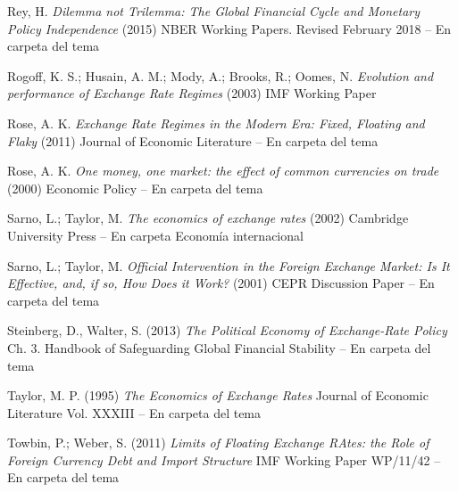 \documentclass{nuevotema}
\begin{document}
Rey, H. \textit{Dilemma not Trilemma: The Global Financial Cycle and Monetary Policy Independence} (2015) NBER Working Papers. Revised February 2018 -- En carpeta del tema

Rogoff, K. S.; Husain, A. M.; Mody, A.; Brooks, R.; Oomes, N. \textit{Evolution and performance of Exchange Rate Regimes} (2003) IMF Working Paper

Rose, A. K. \textit{Exchange Rate Regimes in the Modern Era: Fixed, Floating and Flaky} (2011) Journal of Economic Literature -- En carpeta del tema

Rose, A. K. \textit{One money, one market: the effect of common currencies on trade} (2000) Economic Policy -- En carpeta del tema

Sarno, L.; Taylor, M. \textit{The economics of exchange rates} (2002) Cambridge University Press -- En carpeta Economía internacional

Sarno, L.; Taylor, M. \textit{Official Intervention in the Foreign Exchange Market: Is It Effective, and, if so, How Does it Work?} (2001) CEPR Discussion Paper -- En carpeta del tema

Steinberg, D., Walter, S. (2013) \textit{The Political Economy of Exchange-Rate Policy} Ch. 3. Handbook of Safeguarding Global Financial Stability -- En carpeta del tema

Taylor, M. P. (1995) \textit{The Economics of Exchange Rates} Journal of Economic Literature Vol. XXXIII -- En carpeta del tema

Towbin, P.; Weber, S. (2011) \textit{Limits of Floating Exchange RAtes: the Role of Foreign Currency Debt and Import Structure} IMF Working Paper WP/11/42 -- En carpeta del tema
\end{document}
